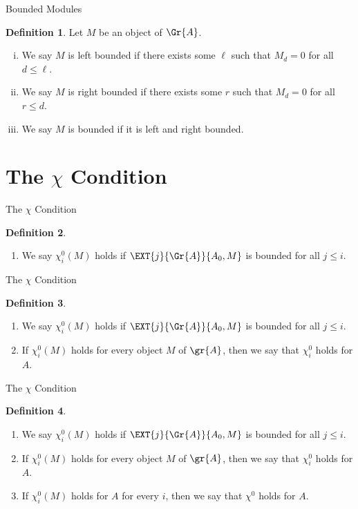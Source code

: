 \documentclass{beamer}
\theoremstyle{definition}
\newtheorem{defn}{Definition}
\begin{document}
\begin{frame}{Bounded Modules}
  \setcounter{defn}{5}
  \begin{defn}
    Let $M$ be an object of $\Gr{A}$.
    \begin{enumerate}[(i)]
    \item
      We say $M$ is left bounded if there exists some $\ell$ such that $M_d = 0$ for all $d \leq \ell$.
      \item
        We say $M$ is right bounded if there exists some $r$ such that $M_d = 0$ for all $r \leq d$.
      \item
        We say $M$ is bounded if it is left and right bounded.
    \end{enumerate}
  \end{defn}
\end{frame}

\section{The $\chi$ Condition}

\begin{frame}{The $\chi$ Condition}
  \begin{defn}
    \begin{enumerate}
    \item
      We say $\chi_i^0(M)$ holds if $\EXT{j}{\Gr{A}}{A_0, M}$ is bounded for all $j \leq i$.
    \end{enumerate}
  \end{defn}
\end{frame}

\begin{frame}{The $\chi$ Condition}
  \setcounter{defn}{6}
  \begin{defn}
    \begin{enumerate}
    \item
      We say $\chi_i^0(M)$ holds if $\EXT{j}{\Gr{A}}{A_0, M}$ is bounded for all $j \leq i$.
    \item
      If $\chi^0_i(M)$ holds for every object $M$ of $\gr{A}$, then we say that $\chi^0_i$ holds for $A$.
    \end{enumerate}
  \end{defn}
\end{frame}

\begin{frame}{The $\chi$ Condition}
  \setcounter{defn}{6}
  \begin{defn}
    \begin{enumerate}
    \item
      We say $\chi_i^0(M)$ holds if $\EXT{j}{\Gr{A}}{A_0, M}$ is bounded for all $j \leq i$.
    \item
      If $\chi^0_i(M)$ holds for every object $M$ of $\gr{A}$, then we say that $\chi^0_i$ holds for $A$.
    \item
      If $\chi^0_i(M)$ holds for $A$ for every $i$, then we say that $\chi^0$ holds for $A$.
    \end{enumerate}
  \end{defn}
\end{frame}
\end{document}
